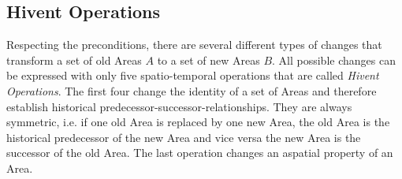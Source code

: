 

\subsection{Hivent Operations} %
\label{sub:hivent_operations}

Respecting the preconditions, there are several different types of changes that transform a set of old Areas $A$ to a set of new Areas $B$. All possible changes can be expressed with only five spatio-temporal operations that are called \emph{Hivent Operations}. The first four change the identity of a set of Areas and therefore establish historical predecessor-successor-relationships. They are always symmetric, i.e. if one old Area is replaced by one new Area, the old Area is the historical predecessor of the new Area and vice versa the new Area is the successor of the old Area. The last operation changes an aspatial property of an Area.

